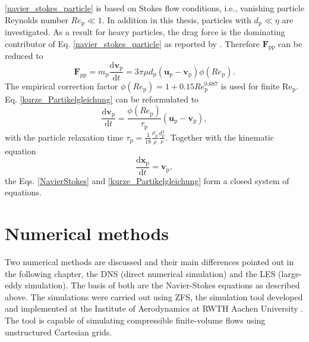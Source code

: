 \documentclass[11pt,a4paper,openany,oneside,parskip=half*]{article}
\renewcommand*\vec[1]{\boldsymbol{#1}}
\begin{document}
\eqref{navier_stokes_particle} is based on Stokes flow conditions, i.e., vanishing particle Reynolds number $Re_\mathrm{p} \ll 1$. In addition in this thesis, particles with $d_\mathrm{p} \ll \eta$ are investigated.
As a result for heavy particles, the drag force is the dominating contributor of Eq. \eqref{navier_stokes_particle} as reported by \cite{TheImportanceOfTheFocusActingOnParticlesInTurbulentFlows}. Therefore $\vec{F}_\mathrm{pp}$ can be reduced to
\begin{equation} \label{kurze_Partikelgleichung}
\vec{F}_\mathrm{pp} =  m_\mathrm{p} \frac{\mathrm{d}\vec{v}_\mathrm{p}}{\mathrm{d}t} = 3 \pi \mu d_\mathrm{p}(\vec{u}_\mathrm{p}-\vec{v}_\mathrm{p})\phi(Re_\mathrm{p}).
\end{equation}
The empirical correction factor $\phi(Re_\mathrm{p}) = 1+0.15Re_\mathrm{p}^\mathrm{0.687}$ is used for finite $\mathrm{Re_\mathrm{p}}$. \newline Eq. \eqref{kurze_Partikelgleichung} can be reformulated to
\begin{equation} \label{shortPaticleDynamics}
\frac{\mathrm{d}\vec{v}_\mathrm{p}}{\mathrm{d}t} = \frac{\phi(Re_\mathrm{p})}{\tau_\mathrm{p}}(\vec{u}_\mathrm{p}-\vec{v}_\mathrm{p}),
\end{equation}
with the particle relaxation time $\tau_\mathrm{p}=\frac{1}{18}\frac{\rho_\mathrm{p}}{\rho}\frac{d_\mathrm{p}^\mathrm{2}}{\nu}$. 
\newline
Together with the kinematic equation    
\begin{equation}
 \frac{\mathrm{d}\vec{x}_\mathrm{p}}{\mathrm{d}t} = \vec{v}_\mathrm{p},
\end{equation}
the Eqs.  \eqref{NavierStokes} and \eqref{kurze_Partikelgleichung} form a closed system of equations.
\pagebreak
\section{Numerical methods} %
Two numerical methods are discussed and their main differences pointed out in the following chapter, the DNS (direct numerical simulation) and the LES (large-eddy simulation). The basis of both are the Navier-Stokes equations as described above. The simulations were carried out using ZFS, the simulation tool developed and implemented at the Institute of Aerodynamics at RWTH Aachen University 
\cite{anAdaptiveMultilevelMultigridFormulationForCartesianHierarchicalGridMethods} \cite{aStrictlyConservativeCartesianCutCellMethodForCompressibleViscousFlowsOnAdaptiveGrids}. 
The tool is capable of simulating compressible finite-volume flows using unstructured Cartesian grids.
\newline
\end{document}
